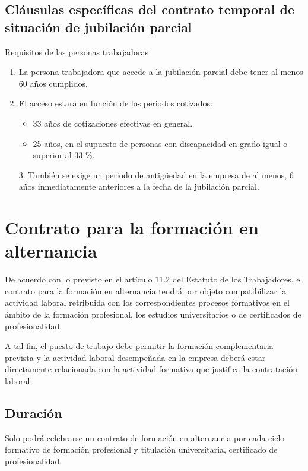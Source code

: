 \documentclass{article}
\begin{document}
	\subsection*{Cláusulas específicas del contrato temporal de situación de jubilación parcial}
	
	Requisitos de las personas trabajadoras
	
	\begin{enumerate}
		\item La persona trabajadora que accede a la jubilación parcial debe tener al menos 60 años cumplidos.
		
		\item El acceso estará en función de los periodos cotizados:
		\begin{itemize}
			\item 33 años de cotizaciones efectivas en general.
			\item 25 años, en el supuesto de personas con discapacidad en grado igual o superior al 33 \%.
		\end{itemize}
		
		3. También se exige un periodo de antigüedad en la empresa de al menos, 6 años inmediatamente anteriores a la fecha de la jubilación parcial.
	\end{enumerate}
	
	\section*{Contrato para la formación en alternancia}
	
	De acuerdo con lo previsto en el artículo 11.2 del Estatuto de los Trabajadores, el contrato para la formación en alternancia tendrá por objeto compatibilizar la actividad laboral retribuida con los correspondientes procesos formativos en el ámbito de la formación profesional, los estudios universitarios o de certificados de profesionalidad.
	
	A tal fin, el puesto de trabajo debe permitir la formación complementaria prevista y la actividad laboral desempeñada en la empresa deberá estar directamente relacionada con la actividad formativa que justifica la contratación laboral.
	
	\subsection*{Duración}
	
	Solo podrá celebrarse un contrato de formación en alternancia por cada ciclo formativo de formación profesional y titulación universitaria, certificado de profesionalidad.
	
\end{document}
